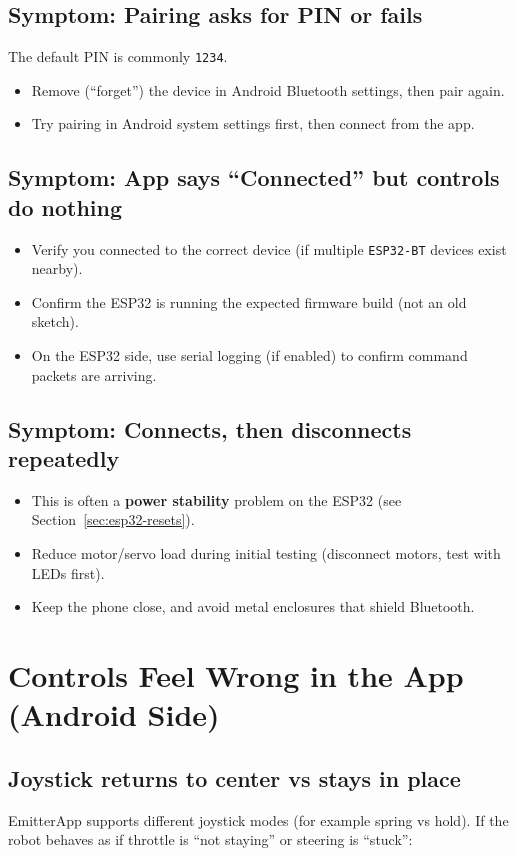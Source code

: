 \subsection*{Symptom: Pairing asks for PIN or fails}
The default PIN is commonly \texttt{1234}.
\begin{itemize}
    \item Remove (``forget'') the device in Android Bluetooth settings, then pair again.
    \item Try pairing in Android system settings first, then connect from the app.
\end{itemize}

\subsection*{Symptom: App says ``Connected'' but controls do nothing}
\begin{itemize}
    \item Verify you connected to the correct device (if multiple \texttt{ESP32-BT} devices exist nearby).
    \item Confirm the ESP32 is running the expected firmware build (not an old sketch).
    \item On the ESP32 side, use serial logging (if enabled) to confirm command packets are arriving.
\end{itemize}

\subsection*{Symptom: Connects, then disconnects repeatedly}
\begin{itemize}
    \item This is often a \textbf{power stability} problem on the ESP32 (see Section~\ref{sec:esp32-resets}).
    \item Reduce motor/servo load during initial testing (disconnect motors, test with LEDs first).
    \item Keep the phone close, and avoid metal enclosures that shield Bluetooth.
\end{itemize}

\section{Controls Feel Wrong in the App (Android Side)}
\label{sec:android-controls}

\subsection*{Joystick returns to center vs stays in place}
EmitterApp supports different joystick modes (for example spring vs hold). If the robot behaves
as if throttle is ``not staying'' or steering is ``stuck'':


